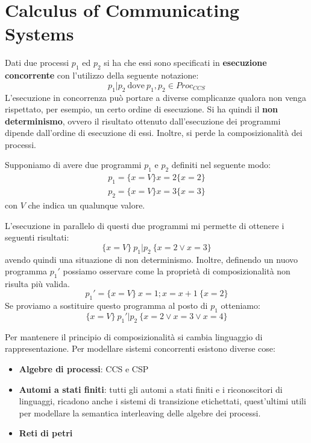 \chapter{Calculus of Communicating Systems}
Dati due processi $p_1$ ed $p_2$ si ha che essi sono specificati in
\textbf{esecuzione concorrente} con l'utilizzo della seguente notazione:
\begin{equation}
    p_1 | p_2 \ \text{dove} \ p_1, p_2 \in Proc_{CCS}
\end{equation}
L'esecuzione in concorrenza può portare a diverse complicanze qualora non venga
rispettato, per esempio, un certo ordine di esecuzione. Si ha quindi il
\textbf{non determinismo}, ovvero il risultato ottenuto dall'esecuzione dei
programmi dipende dall'ordine di esecuzione di essi. Inoltre, si perde la
composizionalità dei processi.
\begin{esempio}
    Supponiamo di avere due programmi $p_1$ e $p_2$ definiti nel seguente
    modo:
    \begin{equation}
        \begin{aligned}
            p_1 =\{x = V\} x = 2 \{x = 2\} \\
            p_2 =\{x = V\} x = 3 \{x = 3\}
        \end{aligned}
    \end{equation}
    con $V$ che indica un qualunque valore.

    L'esecuzione in parallelo di questi due programmi mi permette di ottenere i
    seguenti risultati:
    \begin{equation}
        \{x = V\} \ p_1 | p_2 \ \{x = 2 \lor x = 3\}
    \end{equation}
    avendo quindi una situazione di non determinismo. Inoltre, definendo un nuovo
    programma $p_1'$ possiamo osservare come la proprietà di composizionalità non
    risulta più valida.
    \begin{equation}
        p_1' = \{x = V\} \ x = 1; x = x + 1 \ \{x = 2\}
    \end{equation}
    Se proviamo a sostituire questo programma al posto di $p_1$ otteniamo:
    \begin{equation}
        \{x = V\} \ p_1' | p_2 \ \{x = 2 \lor x = 3 \lor x = 4\}
    \end{equation}
\end{esempio}
Per mantenere il principio di composizionalità si cambia linguaggio di
rappresentazione. Per modellare sistemi concorrenti esistono diverse cose:
\begin{itemize}
    \item \textbf{Algebre di processi}: CCS e CSP
    \item \textbf{Automi a stati finiti}: tutti gli automi a stati finiti e i
          riconoscitori di linguaggi, ricadono anche i sistemi di transizione
          etichettati, quest'ultimi utili per modellare la semantica interleaving
          delle algebre dei processi.
    \item \textbf{Reti di petri}
\end{itemize}
